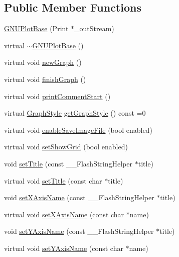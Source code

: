 \subsection*{Public Member Functions}
\begin{DoxyCompactItemize}
\item 
\hyperlink{class_g_n_u_plot_base_aee6453a84c4357b1fcde2f14b455423f}{G\+N\+U\+Plot\+Base} (Print $\ast$\+\_\+out\+Stream)
\item 
virtual \hyperlink{class_g_n_u_plot_base_abca2da63bc2e235c11d6bca89a954f6d}{$\sim$\+G\+N\+U\+Plot\+Base} ()
\item 
virtual void \hyperlink{class_g_n_u_plot_base_a4d4da234cfdeb99ec3228ef7b2df8a50}{new\+Graph} ()
\item 
virtual void \hyperlink{class_g_n_u_plot_base_aa4b0574c35fbee4dc5f25451eaf956dd}{finish\+Graph} ()
\item 
virtual void \hyperlink{class_g_n_u_plot_base_a219601bd41203477ae73a18d18dd7443}{print\+Comment\+Start} ()
\item 
virtual \hyperlink{_serial_graph_8h_adc73bce6b7e6c4ecf37dde452d6a385e}{Graph\+Style} \hyperlink{class_serial_graph_a2ab97096fffdf429bfa271b9fd4c642a}{get\+Graph\+Style} () const  =0
\item 
virtual void \hyperlink{class_serial_graph_a28b020807c52c113685aa6a31f836c52}{enable\+Save\+Image\+File} (bool enabled)
\item 
virtual void \hyperlink{class_serial_graph_abf488e449d6d786bc01478793d0094ad}{set\+Show\+Grid} (bool enabled)
\item 
void \hyperlink{class_serial_graph_a4db09b008589914b71b2ee8b1873db7a}{set\+Title} (const \+\_\+\+\_\+\+Flash\+String\+Helper $\ast$title)
\item 
virtual void \hyperlink{class_serial_graph_ad726b2c84cec50c2d4bfe769e62a9bcd}{set\+Title} (const char $\ast$title)
\item 
void \hyperlink{class_serial_graph_afdb759a860c41de2fc4cfe78519b9fc0}{set\+X\+Axis\+Name} (const \+\_\+\+\_\+\+Flash\+String\+Helper $\ast$title)
\item 
virtual void \hyperlink{class_serial_graph_ac7f30036f5006091af51204a4d9efaf2}{set\+X\+Axis\+Name} (const char $\ast$name)
\item 
void \hyperlink{class_serial_graph_abfc46c15cf8e1b4362a7f51cb11c7bdb}{set\+Y\+Axis\+Name} (const \+\_\+\+\_\+\+Flash\+String\+Helper $\ast$title)
\item 
virtual void \hyperlink{class_serial_graph_ab0c675c8682959261f79dcf37b04148c}{set\+Y\+Axis\+Name} (const char $\ast$name)

\end{DoxyCompactItemize}
